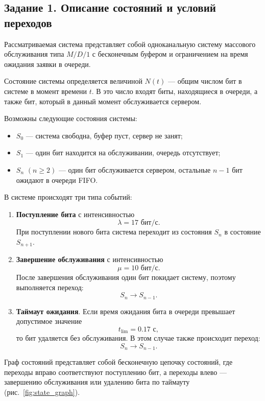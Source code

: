 \documentclass[a4paper,12pt]{article}
\begin{document}
\subsection*{Задание 1. Описание состояний и условий переходов}

Рассматриваемая система представляет собой одноканальную систему массового обслуживания типа \(M/D/1\) с бесконечным буфером и ограничением на время ожидания заявки в очереди.

Состояние системы определяется величиной \(N(t)\) — общим числом бит в системе в момент времени \(t\). В это число входят биты, находящиеся в очереди, а также бит, который в данный момент обслуживается сервером.

Возможны следующие состояния системы:
\begin{itemize}
    \item \(S_0\) — система свободна, буфер пуст, сервер не занят;
    \item \(S_1\) — один бит находится на обслуживании, очередь отсутствует;
    \item \(S_n\) \((n \ge 2)\) — один бит обслуживается сервером, остальные \(n-1\) бит ожидают в очереди FIFO.
\end{itemize}

В системе происходят три типа событий:
\begin{enumerate}
    \item \textbf{Поступление бита} с интенсивностью
    \[
    \lambda = 17 \text{ бит/с}.
    \]
    При поступлении нового бита система переходит из состояния \(S_n\) в состояние \(S_{n+1}\).

    \item \textbf{Завершение обслуживания} с интенсивностью
    \[
    \mu = 10 \text{ бит/с}.
    \]
    После завершения обслуживания один бит покидает систему, поэтому выполняется переход:
    \[
    S_n \rightarrow S_{n-1}.
    \]

    \item \textbf{Таймаут ожидания}.  
    Если время ожидания бита в очереди превышает допустимое значение
    \[
    t_{\text{lim}} = 0.17 \text{ с},
    \]
    то бит удаляется без обслуживания. В этом случае также происходит переход:
    \[
    S_n \rightarrow S_{n-1}.
    \]
\end{enumerate}

Граф состояний представляет собой бесконечную цепочку состояний, где переходы вправо соответствуют поступлению бит, а переходы влево — завершению обслуживания или удалению бита по таймауту (рис.~\ref{fig:state_graph}).
\end{document}
